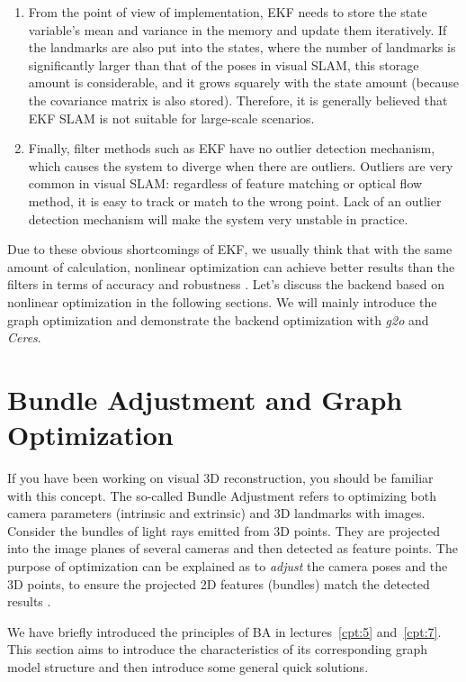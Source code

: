 \begin{enumerate}
	\item 
	From the point of view of implementation, EKF needs to store the state variable's mean and variance in the memory and update them iteratively. If the landmarks are also put into the states, where the number of landmarks is significantly larger than that of the poses in visual SLAM, this storage amount is considerable, and it grows squarely with the state amount (because the covariance matrix is also stored). Therefore, it is generally believed that EKF SLAM is not suitable for large-scale scenarios.
	
	\item 
	Finally, filter methods such as EKF have no outlier detection mechanism, which causes the system to diverge when there are outliers. Outliers are very common in visual SLAM: regardless of feature matching or optical flow method, it is easy to track or match to the wrong point. Lack of an outlier detection mechanism will make the system very unstable in practice.
\end{enumerate}

Due to these obvious shortcomings of EKF, we usually think that with the same amount of calculation, nonlinear optimization can achieve better results than the filters in terms of accuracy and robustness  {\cite{Strasdat2012}}. Let's discuss the backend based on nonlinear optimization in the following sections. We will mainly introduce the graph optimization and demonstrate the backend optimization with \textit{g2o} and \textit{Ceres}.

\section{Bundle Adjustment and Graph Optimization}
If you have been working on visual 3D reconstruction, you should be familiar with this concept. The so-called Bundle Adjustment refers to optimizing both camera parameters (intrinsic and extrinsic) and 3D landmarks with images. Consider the bundles of light rays emitted from 3D points. They are projected into the image planes of several cameras and then detected as feature points. The purpose of optimization can be explained as to \textit{adjust} the camera poses and the 3D points, to ensure the projected 2D features (bundles) match the detected results {\cite{Triggs2000}}.

We have briefly introduced the principles of BA in lectures~\ref{cpt:5} and~\ref{cpt:7}. This section aims to introduce the characteristics of its corresponding graph model structure and then introduce some general quick solutions.

